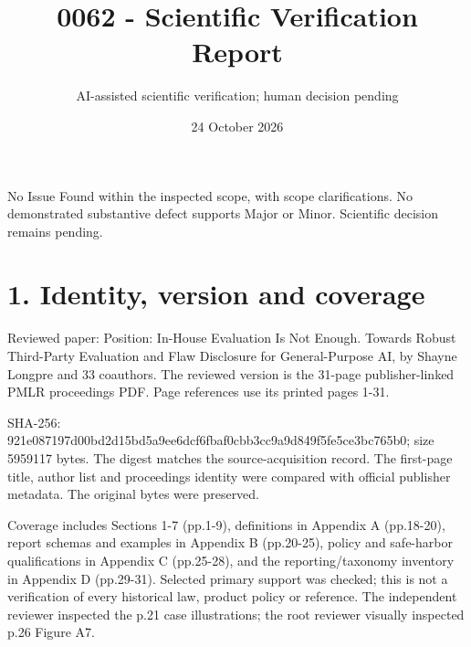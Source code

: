 \documentclass[10pt]{article}
\title{0062 - Scientific Verification Report}
\author{AI-assisted scientific verification; human decision pending}
\date{24 October 2026}
\begin{document}
\maketitle
No Issue Found within the inspected scope, with scope clarifications. No demonstrated substantive defect supports Major or Minor. Scientific decision remains pending.\par
\section*{1. Identity, version and coverage}
Reviewed paper: Position: In-House Evaluation Is Not Enough. Towards Robust Third-Party Evaluation and Flaw Disclosure for General-Purpose AI, by Shayne Longpre and 33 coauthors. The reviewed version is the 31-page publisher-linked PMLR proceedings PDF. Page references use its printed pages 1-31.\par
SHA-256: 921e087197d00bd2d15bd5a9ee6dcf6fbaf0cbb3cc9a9d849f5fe5ce3bc765b0; size 5959117 bytes. The digest matches the source-acquisition record. The first-page title, author list and proceedings identity were compared with official publisher metadata. The original bytes were preserved.\par
Coverage includes Sections 1-7 (pp.1-9), definitions in Appendix A (pp.18-20), report schemas and examples in Appendix B (pp.20-25), policy and safe-harbor qualifications in Appendix C (pp.25-28), and the reporting/taxonomy inventory in Appendix D (pp.29-31). Selected primary support was checked; this is not a verification of every historical law, product policy or reference. The independent reviewer inspected the p.21 case illustrations; the root reviewer visually inspected p.26 Figure A7.\par
\end{document}
